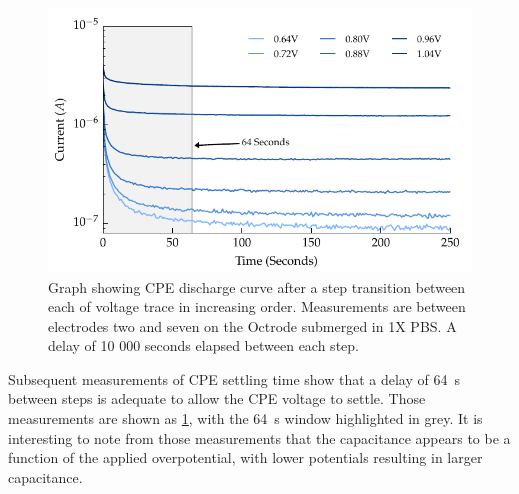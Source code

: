         \begin{figure}
          \centering
          \includegraphics{content/pt2/08-InterfaceParameters/graphics/graph_CPE_currentVsTime_thesis}
          \caption{\label{fig:graph_CPE_currentVsTime}Graph showing CPE discharge curve after a step transition between each of voltage trace in increasing order. Measurements are between electrodes two and seven on the Octrode submerged in 1X PBS. A delay of 10 000 seconds elapsed between each step.}
        \end{figure}
        Subsequent measurements of CPE settling time show that a delay of \SI{64}{\second} between steps is adequate to allow the CPE voltage to settle.
        Those measurements are shown as \cref{fig:graph_CPE_currentVsTime}, with the \SI{64}{\second} window highlighted in grey.
        It is interesting to note from those measurements that the capacitance appears to be a function of the applied overpotential, with lower potentials resulting in larger capacitance.

